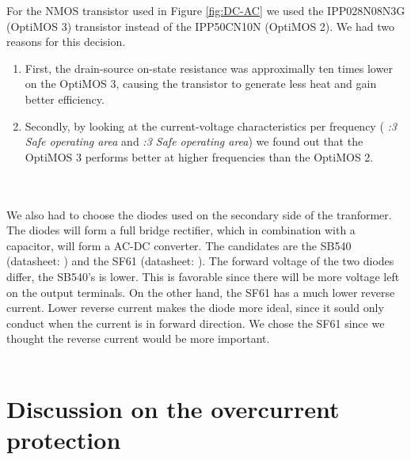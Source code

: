 \documentclass[final]{scrreprt} %
\begin{document}
For the NMOS transistor used in Figure \ref{fig:DC-AC} we used the IPP028N08N3G (OptiMOS 3) transistor instead of the IPP50CN10N (OptiMOS 2).
We had two reasons for this decision.
\begin{enumerate}
\item First, the drain-source on-state resistance was approximally ten times lower on the OptiMOS 3, causing the transistor to generate less heat and gain better efficiency.
\item Secondly, by looking at the current-voltage characteristics per frequency (\cite{OptiMOS2} \emph{:3 Safe operating area} and \cite{OptiMOS3} \emph{:3 Safe operating area}) we found out that the OptiMOS 3 performs better at higher frequencies than the OptiMOS 2.
\end{enumerate}
\\ \\
We also had to choose the diodes used on the secondary side of the tranformer. The diodes will form a full bridge rectifier, which in combination with a capacitor, will form a AC-DC converter.
The candidates are the SB540 (datasheet: \cite{SB540}) and the SF61 (datasheet: \cite{SF61}).
The forward voltage of the two diodes differ, the SB540's is lower. This is favorable since there will be more voltage left on the output terminals.
On the other hand, the SF61 has a much lower reverse current. Lower reverse current makes the diode more ideal, since it sould only conduct when the current is in forward direction.
We chose the SF61 since we thought the reverse current would be more important.
\\ \\





\chapter{Discussion on the overcurrent protection}
\end{document}
